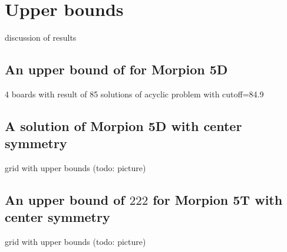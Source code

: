\section{Upper bounds}
\label{sec:upper}

  discussion of results
  
\subsection{An upper bound of \therecord for Morpion 5D}

  4 boards with result of 85
  solutions of acyclic problem with cutoff=84.9

\subsection{A solution of Morpion 5D with center symmetry}

  grid with upper bounds (todo: picture)
  
\subsection{An upper bound of $222$ for Morpion 5T with center symmetry}

  grid with upper bounds (todo: picture)
